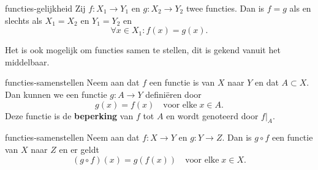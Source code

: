 \begin{stelling}{}{functies-gelijkheid}
    Zij $f: X_1 \to Y_1$ en $g: X_2 \to Y_2$ twee functies.
    Dan is $f = g$ als en slechts als $X_1 = X_2$ en $Y_1 = Y_2$ en
    \[
        \forall x \in X_1: f(x) = g(x).
    \]
\end{stelling}

Het is ook mogelijk om functies samen te stellen, dit is gekend vanuit het middelbaar.
\begin{definitie}{}{functies-samenstellen}
    Neem aan dat $f$ een functie is van $X$ naar $Y$ en dat $A \subset X$.
    Dan kunnen we een functie $g: A \to Y$ definiëren door
    \[
        g(x) = f(x)
        \quad \text{voor elke}\; x \in A.
    \]
    Deze functie is de \textbf{beperking} van $f$ tot $A$ en wordt genoteerd door $f\vert_A$.
\end{definitie}
\begin{stelling}{}{functies-samenstellen}
    Neem aan dat $f: X \to Y$ en $g: Y \to Z$.
    Dan is $g \circ f$ een functie van $X$ naar $Z$ en er geldt
    \begin{equation}
        (g \circ f)(x) = g(f(x)) \quad \text{voor elke}\; x \in X.
        \label{eq:functies-samenstellen}
    \end{equation}
\end{stelling}
